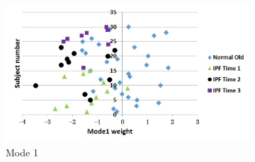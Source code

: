 \begin{figure}[htbp] 
\centering
\begin{subfigure}{.65\linewidth}%
  \includegraphics[width=\linewidth,trim={{.0\wd0} {.0\wd0} {.0\wd0} {.0\wd0}},clip]{QuantitativeAnalysis/Image/TimePoint_Mode1.jpg} %
  \caption{Mode 1}
  \label{fig:ShapeDifference-a} 
\end{subfigure} 
\begin{subfigure}{.65\linewidth}%

\end{subfigure}
\end{figure}
